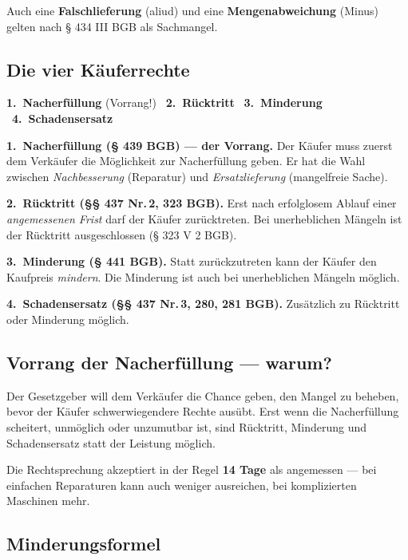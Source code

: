 \documentclass[11pt, a4paper]{article}
\begin{document}
Auch eine \textbf{Falschlieferung} (aliud) und eine \textbf{Mengenabweichung} (Minus)
gelten nach § 434 III BGB als Sachmangel.

\subsection{Die vier Käuferrechte}

\begin{merksatz}[title={§ 437 BGB --- Käuferrechte im Überblick}]
\textbf{1.\ Nacherfüllung} (Vorrang!) \textbar\ \textbf{2.\ Rücktritt} \textbar\ \textbf{3.\ Minderung} \textbar\ \textbf{4.\ Schadensersatz}
\end{merksatz}

\textbf{1.\ Nacherfüllung (§ 439 BGB) --- der Vorrang.} Der Käufer muss zuerst dem
Verkäufer die Möglichkeit zur Nacherfüllung geben. Er hat die Wahl zwischen
\emph{Nachbesserung} (Reparatur) und \emph{Ersatzlieferung} (mangelfreie Sache).

\textbf{2.\ Rücktritt (§§ 437 Nr.\,2, 323 BGB).} Erst nach erfolglosem Ablauf einer
\emph{angemessenen Frist} darf der Käufer zurücktreten. Bei unerheblichen Mängeln ist
der Rücktritt ausgeschlossen (§ 323 V 2 BGB).

\textbf{3.\ Minderung (§ 441 BGB).} Statt zurückzutreten kann der Käufer den Kaufpreis
\emph{mindern}. Die Minderung ist auch bei unerheblichen Mängeln möglich.

\textbf{4.\ Schadensersatz (§§ 437 Nr.\,3, 280, 281 BGB).} Zusätzlich zu Rücktritt
oder Minderung möglich.

\subsection{Vorrang der Nacherfüllung --- warum?}

Der Gesetzgeber will dem Verkäufer die Chance geben, den Mangel zu beheben, bevor
der Käufer schwerwiegendere Rechte ausübt. Erst wenn die Nacherfüllung scheitert,
unmöglich oder unzumutbar ist, sind Rücktritt, Minderung und Schadensersatz statt
der Leistung möglich.

\begin{merksatz}[title={Angemessene Frist}]
Die Rechtsprechung akzeptiert in der Regel \textbf{14 Tage} als angemessen --- bei
einfachen Reparaturen kann auch weniger ausreichen, bei komplizierten Maschinen mehr.
\end{merksatz}

\subsection{Minderungsformel}
\end{document}
